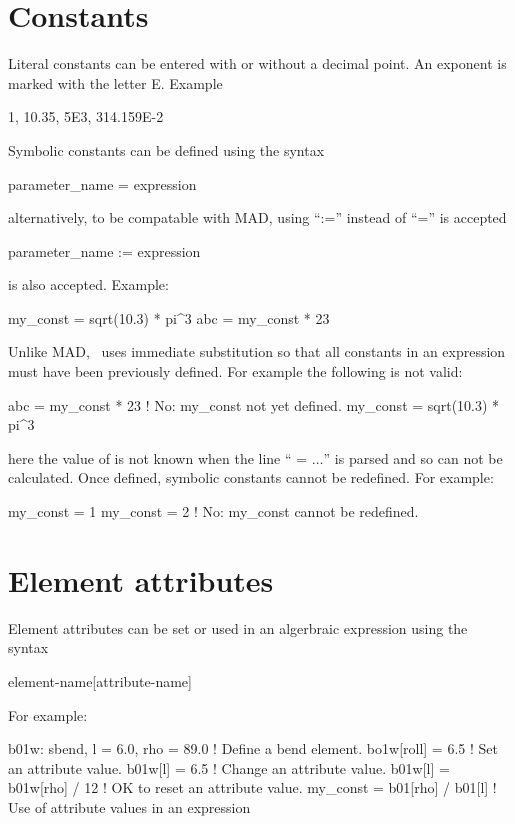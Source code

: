 \section{Constants}

Literal constants can be entered with or without a decimal point. An
exponent is marked with the letter E. Example
\begin{example}
  1, 10.35, 5E3, 314.159E-2
\end{example}
Symbolic constants can be defined using the syntax
\begin{example}
  parameter_name = expression
\end{example}
alternatively, to be compatable with MAD, using ``:='' instead of ``='' is accepted
\begin{example}
  parameter_name := expression
\end{example}
is also accepted. Example:
\begin{example}
  my_const = sqrt(10.3) * pi^3
  abc      = my_const * 23
\end{example}
Unlike MAD, \bmad\ uses immediate substitution so that all constants
in an expression must have been previously defined. For example the
following is not valid:
\begin{example}
  abc      = my_const * 23   ! No: my_const not yet defined.
  my_const = sqrt(10.3) * pi^3
\end{example}
here the value of  is not known when the line ``
= $\ldots$'' is parsed and so  can not be calculated. Once
defined, symbolic constants cannot be redefined. For example:
\begin{example}
  my_const = 1
  my_const = 2  ! No: my_const cannot be redefined.
\end{example}


\section{Element attributes}

Element attributes can be set or used in an algerbraic expression using the syntax
\begin{example}
  element-name[attribute-name]
\end{example}
For example:
\begin{example}
  b01w: sbend, l = 6.0, rho = 89.0   ! Define a bend element.
  bo1w[roll] = 6.5                   ! Set an attribute value.
  b01w[l] = 6.5                      ! Change an attribute value.
  b01w[l] = b01w[rho] / 12           ! OK to reset an attribute value.
  my_const = b01[rho] / b01[l]       ! Use of attribute values in an expression
\end{example}

